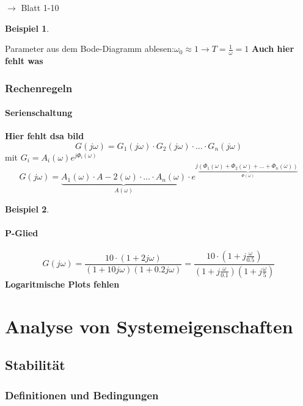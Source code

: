 \message{ !name(Mitschrieb_SysRegel.tex)}\documentclass[12pt,a4paper,ngerman]{scrartcl}
\newtheorem{bsp}{Beispiel}[section] %
\begin{document}
$\rightarrow$ Blatt 1-10
\begin{bsp}
\end{bsp}
Parameter aus dem Bode-Diagramm ablesen:$\omega_0 \approx 1 \rightarrow T=\frac{1}{\omega}=1$
\textbf{Auch hier fehlt was}
\subsubsection{Rechenregeln}

\paragraph{Serienschaltung}

\textbf{Hier fehlt dsa bild}
\[
G(j\omega)=G_1(j\omega)\cdot G_2(j\omega)\cdot \dots \cdot G_n(j\omega)
\]
mit $G_i = A_i(\omega)e^{j\Phi_i(\omega)}$\\
\[
G(j\omega)=\underbrace{A_1(\omega)\cdot A-2(\omega)\cdot \dots \cdot A_n(\omega)}_{A(\omega)}\cdot e^{j\underbrace{(\Phi_1(\omega)+\Phi_2(\omega)+\dots + \Phi_n(\omega))}_{\Phi(\omega)}}
\]
\begin{bsp}
\end{bsp}

\paragraph{P-Glied}
\[
G(j\omega)=\frac{10\cdot(1+2j\omega)}{(1+10j\omega)(1+0.2j\omega)}=\frac{10\cdot (1+j\frac{\omega}{0.5})}{(1+j\frac{\omega}{0.1})(1+j\frac{\omega}{5})}
\]
\textbf{Logaritmische Plots fehlen}

\section{Analyse von Systemeigenschaften}

\subsection{Stabilität}

\subsubsection{Definitionen und Bedingungen}
\end{document}
